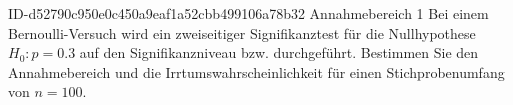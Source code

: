 \begin{exercise}
      {ID-d52790c950e0c450a9eaf1a52cbb499106a78b32}
      {Annahmebereich 1}
  \ifproblem\problem
    Bei einem Bernoulli-Versuch wird ein zweiseitiger Signifikanztest für
    die Nullhypothese $H_0:p=\num{0.3}$ auf den Signifikanzniveau 
    bzw.  durchgeführt. Bestimmen Sie den Annahmebereich und die
    Irrtumswahrscheinlichkeit für einen Stichprobenumfang von $n=100$.
  \fi
\end{exercise}

